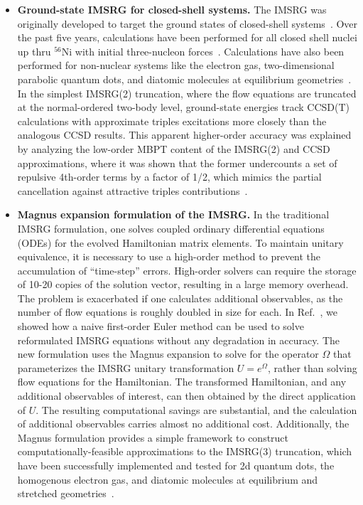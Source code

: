 \begin{itemize}
\item{\bf Ground-state IMSRG for closed-shell systems.} The IMSRG was originally developed to target the ground states of closed-shell systems~\cite{Tsukiyama:2011uq}. Over the past five years, calculations have been performed for all closed shell nuclei up thru $^{56}$Ni with initial three-nucleon forces~\cite{Hergert:2015awm, Hergert:2013mi}. Calculations have also been performed for non-nuclear systems like the electron gas, two-dimensional parabolic quantum dots, and diatomic molecules at equilibrium geometries~\cite{sarahthesis, TitusThesis}. In the simplest IMSRG(2) truncation, where the flow equations are truncated at the normal-ordered two-body level, ground-state energies track CCSD(T) calculations with approximate triples excitations more closely than the analogous CCSD results. This apparent higher-order accuracy was explained by analyzing the low-order MBPT content of the IMSRG(2) and CCSD approximations, where it was shown that the former undercounts a set of repulsive 4th-order terms by a factor of 1/2, which mimics the partial cancellation against attractive triples contributions~\cite{Evangelista, TitusThesis,Hergert:2015awm}.  
 
\item {\bf Magnus expansion formulation of the IMSRG.} In the traditional IMSRG formulation, one solves coupled ordinary differential equations (ODEs) for the evolved Hamiltonian matrix elements. To maintain unitary equivalence, it is necessary to use a high-order method to prevent the accumulation of ``time-step'' errors. High-order solvers can require the storage of 10-20 copies of the solution vector, resulting in a large memory overhead. The problem is exacerbated if one calculates additional observables, as the number of flow equations is roughly doubled in size for each. In Ref.~\cite{Morris:2015ve}, we showed how a naive first-order Euler method can be used to solve reformulated IMSRG equations without any degradation in accuracy. The new formulation uses the Magnus expansion to solve for the operator $\Omega$ that parameterizes the IMSRG unitary transformation $U = e^{\Omega}$, rather than solving flow equations for the Hamiltonian. The transformed Hamiltonian, and any additional observables of interest, can then obtained by the direct application of $U$. The resulting computational savings are substantial, and the calculation of additional observables carries almost no additional cost.  Additionally, the Magnus formulation provides a simple framework to construct computationally-feasible approximations to the IMSRG(3) truncation, which have been successfully implemented and tested for 2d quantum dots, the homogenous electron gas, and diatomic molecules at equilibrium and stretched geometries~\cite{TitusThesis}.   


\end{itemize}
